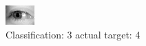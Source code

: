 \begin{figure}[h!]
\begin{center}
\includegraphics[width=0.60\columnwidth]{figures/ID3231_class_3_target_4.png}
\end{center}
\caption{ Classification: 3 actual target: 4}
\label{fig:ID3231_class_3_target_4}
\end{figure}
